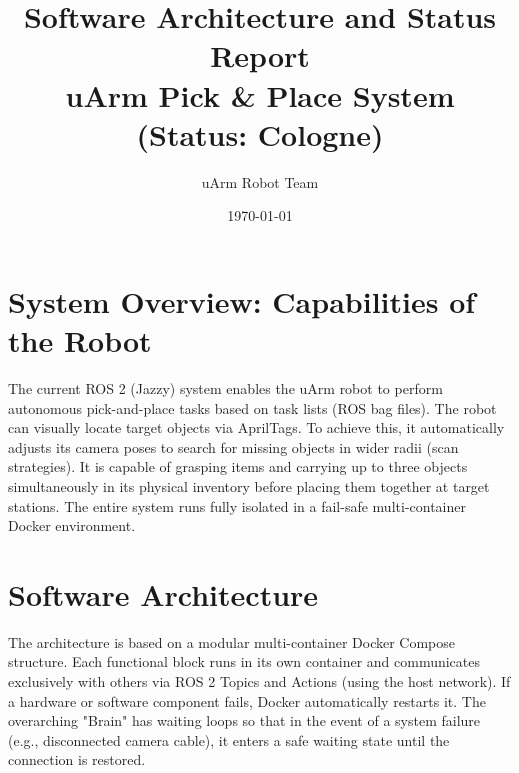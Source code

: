\documentclass[12pt,a4paper]{article}
\title{Software Architecture and Status Report\\ uArm Pick \& Place System (Status: Cologne)}
\author{uArm Robot Team}
\date{\today}
\begin{document}
\maketitle

\section{System Overview: Capabilities of the Robot}
The current ROS 2 (Jazzy) system enables the uArm robot to perform autonomous pick-and-place tasks based on task lists (ROS bag files). The robot can visually locate target objects via AprilTags. To achieve this, it automatically adjusts its camera poses to search for missing objects in wider radii (scan strategies). It is capable of grasping items and carrying up to three objects simultaneously in its physical inventory before placing them together at target stations. The entire system runs fully isolated in a fail-safe multi-container Docker environment.

\section{Software Architecture}
The architecture is based on a modular multi-container Docker Compose structure. Each functional block runs in its own container and communicates exclusively with others via ROS 2 Topics and Actions (using the host network). If a hardware or software component fails, Docker automatically restarts it. The overarching "Brain" has waiting loops so that in the event of a system failure (e.g., disconnected camera cable), it enters a safe waiting state until the connection is restored.
\end{document}
